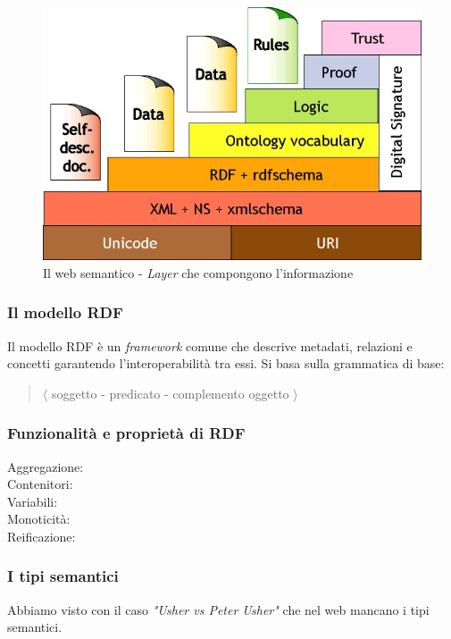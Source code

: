 			\begin{figure}
				\centering
				\includegraphics[scale=0.5]{images/LInformazioneEIlWebSemantico-WebSemantico1}
				\caption{Il web semantico - \emph{Layer} che compongono l'informazione}
				\label{fig:LInformazioneEIlWebSemantico-WebSemantico}
			\end{figure}			
			
			\subsubsection{Il modello RDF}
				Il modello RDF è un \emph{framework} comune che descrive metadati, relazioni e concetti garantendo l'interoperabilità tra essi. Si basa sulla grammatica di base:
				\begin{quote}
					$\langle$ soggetto - predicato - complemento oggetto $\rangle$
				\end{quote}
			
			\subsubsection{Funzionalità e proprietà di RDF}
			
				\begin{description}
					\item[Aggregazione:]
					\item[Contenitori:]
					\item[Variabili:]
					\item[Monoticità:]
					\item[Reificazione:]
				\end{description}
				
			\subsubsection{I tipi semantici}
				Abbiamo visto con il caso \emph{"Usher vs Peter Usher"} che nel web mancano i tipi semantici.
				
